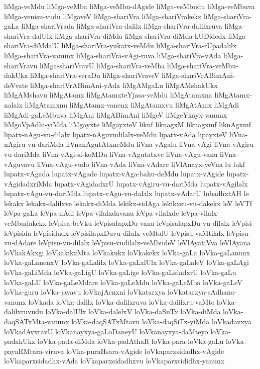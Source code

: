 {liMga-veMdu
liMga-veMba
liMga-veMbu-dAgide
liMga-veMbudu
liMga-veMbuva
liMga-venisu-vudu
liMgaveV
liMga-shariVra
liMga-shariVrakekx
liMga-shariVra-gaLa
liMga-shariVrada
liMga-shariVra-dalilx
liMga-shariVra-dalilxruva
liMga-shariVra-dalUlx
liMga-shariVra-diMda
liMga-shariVra-diMda-kUDidedx
liMga-shariVra-diMdalU
liMga-shariVra-yukatx-veMdu
liMga-shariVra-rUpadalilx
liMga-shariVra-vanunx
liMga-shariVra-vAgi-ruva
liMga-shariVra-vAda
liMga-shariVravu
liMga-shariVravU
liMga-shariVra-veMba
liMga-shariVra-veMbu-dakUkx
liMga-shariVra-veraDu
liMga-shariVraveV
liMga-shariVrABimAni-deVvate
liMga-shariVrABimAni-yAda
liMgAMgaLu
liMgAMshakUkx
liMgAMshavu
liMgAtamx
liMgAtamxteYjasa-veMdu
liMgAtamxna
liMgAtamx-nalalx
liMgAtamxnu
liMgAtamx-vanenx
liMgAtamxvu
liMgAtAmx
liMgAdi
liMgAdi-gaLeMbuva
liMgAni
liMgABimAni
liMgeV
liMgeYkayx-vanunx
liMgoVpAdhi-yiMda
liMgayxte
liMgayxteV
liknf
liknagxM
liknagxmf
liknAgxmf
lipatx-nAgu-vu-dilalx
lipatx-nAguvudilalx-veMdu
lipatx-vAda
lipayxteV
liVna-nAgiru-vu-dariMda
liVnanAgutAtxneMdu
liVna-vAgalu
liVna-vAgi
liVna-vAgiru-vu-dariMda
liVna-vAgi-si-koMDu
liVna-vAgutatxve
liVna-vAgu-vanu
liVna-vAguvavu
liVna-vAgu-vudo
liVna-vAda
liVna-vAdare
liVlAnayx-yeVna
lu
lukf
lupatx-vAgada
lupatx-vAgade
lupatx-vAga-bahu-deMdu
lupatx-vAgide
lupatx-vAgidadxriMda
lupatx-vAgidadxrU
lupatx-vAgiru-vu-dariMda
lupatx-vAgilalx
lupatx-vAgu-vu-dariMda
lupatx-vAgu-vu-dalalx
lupatx-vAdarU
lubadhxtAH
le
lekakx
lekakx-dalilxve
lekakx-diMda
lekikx-sidAga
lekikxsu-vu-dakekx
leV
leVTf
leVpa-gaLa
leVpa-nAdi
leVpa-vilalxdavanu
leVpa-vilalxde
leVpa-vilalx-veMbudakekx
leVpisa-beVku
leVpisalapxDu-vanu
leVpisalapxDu-vu-dilalx
leVpisi
leVpisida
leVpisidudx
leVpisilapxDuvu-dilalx-veMtalU
leVpisu-vaMtilalx
leVpisu-vu-dAdare
leVpisu-vu-dilalx
leVpisu-vudilalx-veMbudeV
leVlAyatiVva
leVlAyana
loVkakAkxgi
loVkakikxMta
loVkakukx
loVkakekx
loVka-gaLa
loVka-gaLanunx
loVka-gaLanenxV
loVka-gaLalilx
loVka-gaLalUlx
loVka-gaLaleV
loVka-gaLAgi
loVka-gaLiMda
loVka-gaLigU
loVka-gaLige
loVka-gaLidadxrU
loVka-gaLu
loVka-gaLU
loVka-gaLeMdare
loVka-gaLeMdu
loVka-gaLeMba
loVka-gaLeV
loVka-guru
loVka-jayavu
loVkajAcnxni
loVkatarxya
loVkatarxya-sAdhana-vanunx
loVkada
loVka-dalilx
loVka-dalilxruva
loVka-dalilxru-vaMte
loVka-dalilxruvudu
loVka-dalUlx
loVka-dalelxV
loVka-daSuTx
loVka-diMda
loVka-daqSATxMta-vanunx
loVka-daqSATxMtavu
loVka-daqSiTx-yiMda
loVkadavxya
loVkadAvxravU
loVkanayxya-gaLoDaneyU
loVkanayxya-daMteyo
loVka-padakUkx
loVka-pada-diMda
loVka-padAthaR
loVka-para-loVka-gaLu
loVka-payaRMtara-viruva
loVka-puraHsara-vAgide
loVkaparxsidadhx-vAgide
loVkaparxsidadhx-vAda
loVkaparxsidadhxvu
loVkaparxsididhx-yanunx
}

